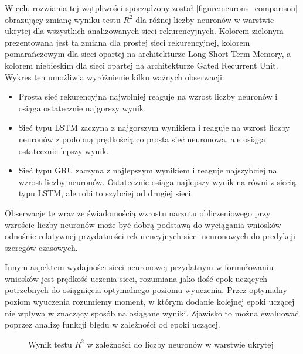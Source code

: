 \documentclass[10pt,a4paper]{article}
\begin{document}
W celu rozwiania tej wątpliwości sporządzony został \autoref{figure:neurons_comparison} obrazujący zmianę wyniku testu $R^2$ dla różnej liczby neuronów w warstwie ukrytej dla wszystkich analizowanych sieci rekurencyjnych. Kolorem zielonym prezentowana jest ta zmiana dla prostej sieci rekurencyjnej, kolorem pomarańczowym dla sieci opartej na architekturze Long Short-Term Memory, a kolorem niebieskim dla sieci opartej na architekturze Gated Recurrent Unit. Wykres ten umożliwia wyróżnienie kilku ważnych obserwacji:
\begin{itemize}
	\item Prosta sieć rekurencyjna najwolniej reaguje na wzrost liczby neuronów i osiąga ostatecznie najgorszy wynik.
	\item Sieć typu LSTM zaczyna z najgorszym wynikiem i reaguje na wzrost liczby neuronów z podobną prędkością co prosta sieć neuronowa, ale osiąga ostatecznie lepszy wynik.
	\item Sieć typu GRU zaczyna z najlepszym wynikiem i reaguje najszybciej na wzrost liczby neuronów. Ostatecznie osiąga najlepszy wynik na równi z siecią typu LSTM, ale robi to szybciej od drugiej sieci. 
\end{itemize}
Obserwacje te wraz ze świadomością wzrostu narzutu obliczeniowego przy wzroście liczby neuronów może być dobrą podstawą do wyciągania wniosków odnośnie relatywnej przydatności rekurencyjnych sieci neuronowych do predykcji szeregów czasowych.

Innym aspektem wydajności sieci neuronowej przydatnym w formułowaniu wniosków jest prędkość uczenia sieci, rozumiana jako ilość epok uczących potrzebnych do osiągnięcia optymalnego poziomu wyuczenia. Przez optymalny poziom wyuczenia rozumiemy moment, w którym dodanie kolejnej epoki uczącej nie wpływa w znaczący sposób na osiągane wyniki. Zjawisko to można ewaluować poprzez analizę funkcji błędu w zależności od epoki uczącej. 

\begin{figure}[!ht]
	\centering
	\caption{Wynik testu $R^2$ w zależności do liczby neuronów w warstwie ukrytej}
	\label{figure:loss_history}
\end{figure}
\FloatBarrier
\end{document}
